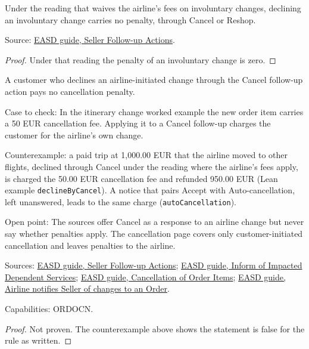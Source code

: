 \begin{theorem}
  \label{thm:airline-change-decline-waived}
  Under the reading that waives the airline's fees on involuntary changes,
  declining an involuntary change carries no penalty, through Cancel or
  Reshop.

  Source: \href{https://standards.atlassian.net/wiki/spaces/EASD/pages/574849094}{EASD guide, Seller Follow-up Actions}.
\end{theorem}
\begin{proof}
  Under that reading the penalty of an involuntary change is zero.
\end{proof}

\begin{theorem}
  \label{thm:airline-change-cancel-after-involuntary}
  A customer who declines an airline-initiated change through the Cancel
  follow-up action pays no cancellation penalty.

  Case to check: In the itinerary change worked example the new order item
  carries a 50 EUR cancellation fee. Applying it to a Cancel follow-up
  charges the customer for the airline's own change.

  Counterexample: a paid trip at 1,000.00 EUR that the airline moved to other
  flights, declined through Cancel under the reading where the airline's fees
  apply, is charged the 50.00 EUR cancellation fee and refunded 950.00 EUR
  (Lean example \texttt{declineByCancel}).  A notice that pairs Accept with
  Auto-cancellation, left unanswered, leads to the same charge
  (\texttt{autoCancellation}).

  Open point: The sources offer Cancel as a response to an airline change
  but never say whether penalties apply. The cancellation page covers only
  customer-initiated cancellation and leaves penalties to the airline.

  Sources: \href{https://standards.atlassian.net/wiki/spaces/EASD/pages/574849094}{EASD guide, Seller Follow-up Actions};
  \href{https://standards.atlassian.net/wiki/spaces/EASD/pages/672825400}{EASD guide, Inform of Impacted Dependent Services};
  \href{https://standards.atlassian.net/wiki/spaces/EASD/pages/574783569}{EASD guide, Cancellation of Order Items};
  \href{https://standards.atlassian.net/wiki/spaces/EASD/pages/815202352}{EASD guide, Airline notifies Seller of changes to an Order}.

  Capabilities: ORDOCN.
\end{theorem}
\begin{proof}
  Not proven.  The counterexample above shows the statement is false for the
  rule as written.
\end{proof}


